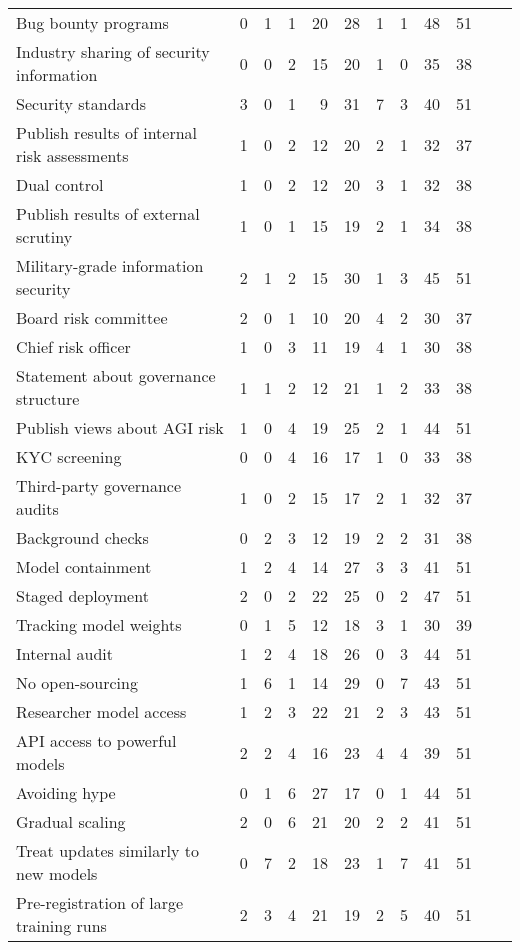 \documentclass{article}
\begin{document}
\begin{sidewaystable}
\begin{tabular}{l *{11}{r}}
Bug bounty programs & 0 & 1 & 1 & 20 & 28 & 1 & 1 & 48 & 51 \\
Industry sharing of security information & 0 & 0 & 2 & 15 & 20 & 1 & 0 & 35 & 38 \\
Security standards & 3 & 0 & 1 & 9 & 31 & 7 & 3 & 40 & 51 \\
Publish results of internal risk assessments & 1 & 0 & 2 & 12 & 20 & 2 & 1 & 32 & 37 \\
Dual control & 1 & 0 & 2 & 12 & 20 & 3 & 1 & 32 & 38 \\
Publish results of external scrutiny & 1 & 0 & 1 & 15 & 19 & 2 & 1 & 34 & 38 \\
Military-grade information security & 2 & 1 & 2 & 15 & 30 & 1 & 3 & 45 & 51 \\
Board risk committee & 2 & 0 & 1 & 10 & 20 & 4 & 2 & 30 & 37 \\
Chief risk officer & 1 & 0 & 3 & 11 & 19 & 4 & 1 & 30 & 38 \\
Statement about governance structure & 1 & 1 & 2 & 12 & 21 & 1 & 2 & 33 & 38 \\
Publish views about AGI risk & 1 & 0 & 4 & 19 & 25 & 2 & 1 & 44 & 51 \\
KYC screening & 0 & 0 & 4 & 16 & 17 & 1 & 0 & 33 & 38 \\
Third-party governance audits & 1 & 0 & 2 & 15 & 17 & 2 & 1 & 32 & 37 \\
Background checks & 0 & 2 & 3 & 12 & 19 & 2 & 2 & 31 & 38 \\
Model containment & 1 & 2 & 4 & 14 & 27 & 3 & 3 & 41 & 51 \\
Staged deployment & 2 & 0 & 2 & 22 & 25 & 0 & 2 & 47 & 51 \\
Tracking model weights & 0 & 1 & 5 & 12 & 18 & 3 & 1 & 30 & 39 \\
Internal audit & 1 & 2 & 4 & 18 & 26 & 0 & 3 & 44 & 51 \\
No open-sourcing & 1 & 6 & 1 & 14 & 29 & 0 & 7 & 43 & 51 \\
Researcher model access & 1 & 2 & 3 & 22 & 21 & 2 & 3 & 43 & 51 \\
API access to powerful models & 2 & 2 & 4 & 16 & 23 & 4 & 4 & 39 & 51 \\
Avoiding hype & 0 & 1 & 6 & 27 & 17 & 0 & 1 & 44 & 51 \\
Gradual scaling & 2 & 0 & 6 & 21 & 20 & 2 & 2 & 41 & 51 \\
Treat updates similarly to new models & 0 & 7 & 2 & 18 & 23 & 1 & 7 & 41 & 51 \\
Pre-registration of large training runs & 2 & 3 & 4 & 21 & 19 & 2 & 5 & 40 & 51 \\

\end{tabular}
\end{sidewaystable}
\end{document}
